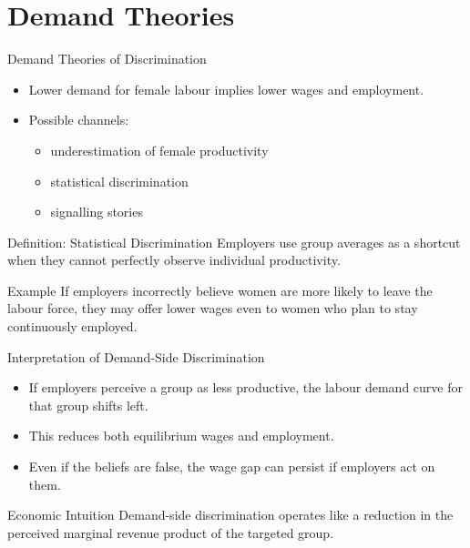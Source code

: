 \documentclass[aspectratio=169]{beamer}
\begin{document}
\section{Demand Theories}

\begin{frame}{Demand Theories of Discrimination}
\transfade
\begin{itemize}[<+->]
  \item Lower demand for female labour implies lower wages and employment.
  \item Possible channels:
  \begin{itemize}[<+->]
    \item underestimation of female productivity
    \item statistical discrimination
    \item signalling stories
  \end{itemize}
\end{itemize}

\begin{block}{Definition: Statistical Discrimination}
Employers use group averages as a shortcut when they cannot perfectly observe individual productivity.
\end{block}

\begin{exampleblock}{Example}
If employers incorrectly believe women are more likely to leave the labour force, they may offer lower wages even to women who plan to stay continuously employed.
\end{exampleblock}
\end{frame}

\begin{frame}{Interpretation of Demand-Side Discrimination}
\transfade
\begin{itemize}[<+->]
  \item If employers perceive a group as less productive, the labour demand curve for that group shifts left.
  \item This reduces both equilibrium wages and employment.
  \item Even if the beliefs are false, the wage gap can persist if employers act on them.
\end{itemize}

\begin{block}{Economic Intuition}
Demand-side discrimination operates like a reduction in the perceived marginal revenue product of the targeted group.
\end{block}
\end{frame}
\end{document}
